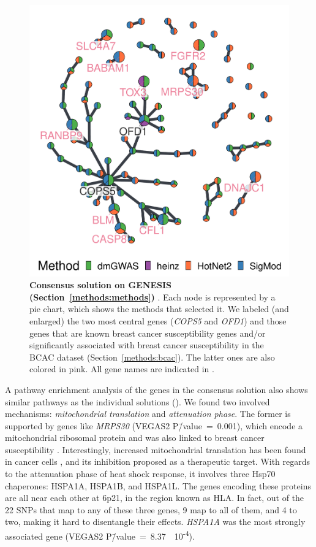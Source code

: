 \documentclass[10pt,letterpaper]{article}
\begin{document}
\begin{figure}[!ht]
  \centering
  \includegraphics[width=.7\linewidth]{./figures/figure_3.pdf}
  \caption{ {\bf Consensus solution on GENESIS (Section~\ref{methods:methods}) }. Each node is represented by a pie chart, which shows the methods that selected it. We labeled (and enlarged) the two most central genes (\emph{COPS5} and \emph{OFD1}) and those genes that are known breast cancer susceptibility genes and/or significantly associated with breast cancer susceptibility in the BCAC dataset (Section~\ref{methods:bcac}). The latter ones are also colored in pink. All gene names are indicated in .}
  \label{fig:consensus}
\end{figure}

A pathway enrichment analysis of the genes in the consensus solution also shows similar pathways as the individual solutions (). We found two involved mechanisms: \emph{mitochondrial translation} and \emph{attenuation phase}. The former is supported by genes like \emph{MRPS30} (VEGAS2 P\=/value~=~0.001), which encode a mitochondrial ribosomal protein and was also linked to breast cancer susceptibility \cite{quigley_5p12_2014}. Interestingly, increased mitochondrial translation has been found in cancer cells \cite{Yu2016Repositioning}, and its inhibition proposed as a therapeutic target. With regards to the attenuation phase of heat shock response, it involves three Hsp70 chaperones: HSPA1A, HSPA1B, and HSPA1L. The genes encoding these proteins are all near each other at 6p21, in the region known as HLA. In fact, out of the 22 SNPs that map to any of these three genes, 9 map to all of them, and 4 to two, making it hard to disentangle their effects. \emph{HSPA1A} was the most strongly associated gene (VEGAS2 P\=/value~=~8.37~\texttimes{}~10\textsuperscript{-4}).  
\end{document}
